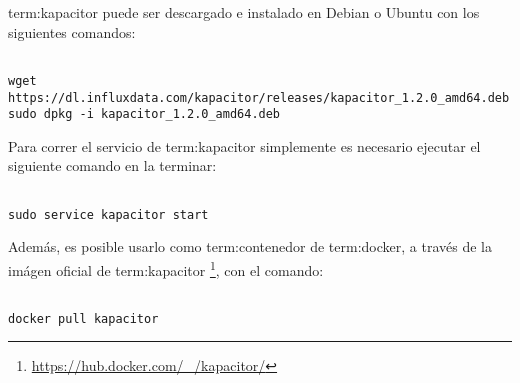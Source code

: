 \gls{term:kapacitor} puede ser descargado e instalado en Debian o Ubuntu con
los siguientes comandos:

\begin{lstlisting}

wget https://dl.influxdata.com/kapacitor/releases/kapacitor_1.2.0_amd64.deb
sudo dpkg -i kapacitor_1.2.0_amd64.deb

\end{lstlisting}

Para correr el servicio de \gls{term:kapacitor} simplemente es necesario
ejecutar el siguiente comando en la terminar:

\begin{lstlisting}

sudo service kapacitor start

\end{lstlisting}

Además, es posible usarlo como \gls{term:contenedor} de \gls{term:docker}, a través de la
imágen oficial de \gls{term:kapacitor}
\footnote{\url{https://hub.docker.com/_/kapacitor/}}, con el comando:

\begin{lstlisting}

docker pull kapacitor

\end{lstlisting}
